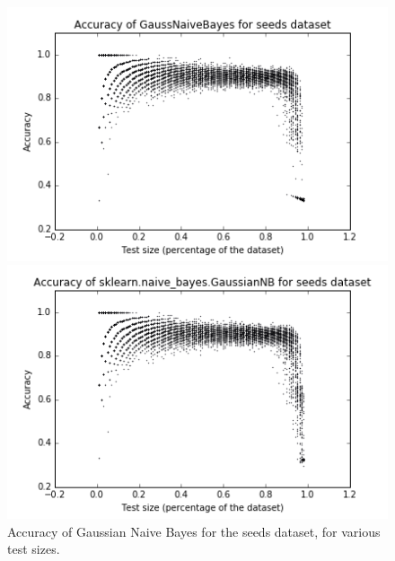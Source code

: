 \documentclass[12pt]{article}
\begin{document}
\begin{figure}[H] 
    \centering
    \begin{minipage}[b]{0.48\textwidth}
    \includegraphics[width=\textwidth]{AccSeeds.png}
    \end{minipage}
    \quad
    \begin{minipage}[b]{0.48\textwidth}
    \includegraphics[width=\textwidth]{sklAccSeeds.png}
    \end{minipage}
    \caption{Accuracy of Gaussian Naive Bayes for the seeds dataset, for various test sizes. }
\end{figure}
 
\end{document}
